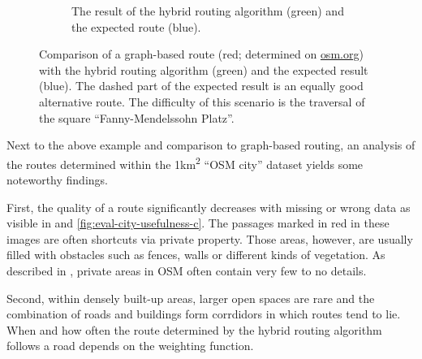 \begin{figure}[h!]
\begin{minipage}[t]{.48\textwidth}
\begin{subfigure}[t]{\linewidth}
\begin{figcenter}
						\end{figcenter}
						\caption{The result of the hybrid routing algorithm (green) and the expected route (blue).}
						\label{fig:eval-osterstrasse-actual-expected}
					\end{subfigure}
				\end{minipage}
				\caption{Comparison of a graph-based route (red; determined on \href{https://www.openstreetmap.org/directions?engine=fossgis\_osrm\_foot\&route=53.57657\%2C9.95210\%3B53.57601\%2C9.95268\#map=19/53.57632/9.95218}{osm.org}) with the hybrid routing algorithm (green) and the expected result (blue). The dashed part of the expected result is an equally good alternative route. The difficulty of this scenario is the traversal of the square \enquote{Fanny-Mendelssohn Platz}.}
				\label{fig:eval-osterstrasse}
			\end{figure}
			
			Next to the above example and comparison to graph-based routing, an analysis of the routes determined within the 1km\textsuperscript{2} \enquote{OSM city} dataset yields some noteworthy findings.
			
			First, the quality of a route significantly decreases with missing or wrong data as visible in  and \ref{fig:eval-city-usefulness-c}.
			The passages marked in red in these images are often shortcuts via private property.
			Those areas, however, are usually filled with obstacles such as fences, walls or different kinds of vegetation.
			As described in , private areas in OSM often contain very few to no details.
			
			Second, within densely built-up areas, larger open spaces are rare and the combination of roads and buildings form corrdidors in which routes tend to lie.
			When and how often the route determined by the hybrid routing algorithm follows a road depends on the weighting function.
			
